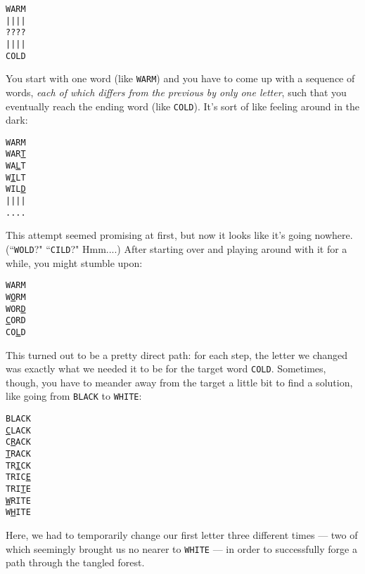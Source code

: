\begin{center}
\texttt{WARM} \\
\texttt{||||} \\
\texttt{????} \\
\texttt{||||} \\
\texttt{COLD}
\end{center}
You start with one word (like \texttt{WARM}) and you have to come up with a
sequence of words, \textit{each of which differs from the previous by only
one letter}, such that you eventually reach the ending word (like
\texttt{COLD}). It's sort of like feeling around in the dark:
\begin{center}
\texttt{WARM} \\
\texttt{WAR\underline{T}} \\
\texttt{WA\underline{L}T} \\
\texttt{W\underline{I}LT} \\
\texttt{WIL\underline{D}} \\
\texttt{||||} \\
\texttt{....}
\end{center}
This attempt seemed promising at first, but now it looks like it's going
nowhere.  (``\texttt{WOLD}?" ``\texttt{CILD}?" Hmm....) After starting over
and playing around with it for a while, you might stumble upon:
\begin{center}
\texttt{WARM} \\
\texttt{W\underline{O}RM} \\
\texttt{WOR\underline{D}} \\
\texttt{\underline{C}ORD} \\
\texttt{CO\underline{L}D}
\end{center}
This turned out to be a pretty direct path: for each step, the letter we
changed was exactly what we needed it to be for the target word
\texttt{COLD}. Sometimes, though, you have to meander away from the target
a little bit to find a solution, like going from \texttt{BLACK} to
\texttt{WHITE}:
\begin{nobreak}
\begin{center}
\texttt{BLACK} \\
\texttt{\underline{C}LACK} \\
\texttt{C\underline{R}ACK} \\
\texttt{\underline{T}RACK} \\
\texttt{TR\underline{I}CK} \\
\texttt{TRIC\underline{E}} \\
\texttt{TRI\underline{T}E} \\
\texttt{\underline{W}RITE} \\
\texttt{W\underline{H}ITE}
\end{center}
\end{nobreak}
Here, we had to temporarily change our first letter three different times
--- two of which seemingly brought us no nearer to \texttt{WHITE} --- in
order to successfully forge a path through the tangled forest.

